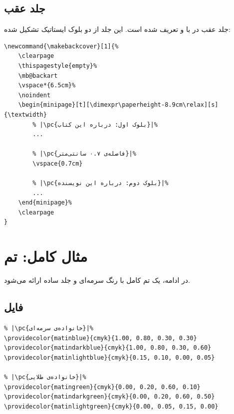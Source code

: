 
\subsection{جلد عقب}
\label{sec:custom-theme-back}

جلد عقب در  با
 و  تعریف
شده است. این جلد از دو بلوک ایستاتیک تشکیل
شده:

\begin{latin}
\begin{verbatim}
\newcommand{\makebackcover}[1]{%
    \clearpage
    \thispagestyle{empty}%
    \mb@backart
    \vspace*{6.5cm}%
    \noindent
    \begin{minipage}[t][\dimexpr\paperheight-8.9cm\relax][s]{\textwidth}
        % |\pc{بلوک اول: درباره این کتاب}|%
        ...

        % |\pc{فاصله‌ی ۰.۷ سانتی‌متر}|%
        \vspace{0.7cm}

        % |\pc{بلوک دوم: درباره این نویسنده}|%
        ...
    \end{minipage}%
    \clearpage
}
\end{verbatim}
\end{latin}


\section{مثال کامل: تم }
\label{sec:custom-theme-example}

در ادامه، یک تم کامل با رنگ سرمه‌ای و
جلد ساده ارائه می‌شود.

\subsection{فایل }
\label{sec:custom-theme-example-colors}

\begin{latin}
\begin{verbatim}
% |\pc{خانواده‌ی سرمه‌ای}|%
\providecolor{matinblue}{cmyk}{1.00, 0.80, 0.30, 0.30}
\providecolor{matindarkblue}{cmyk}{1.00, 0.80, 0.30, 0.60}
\providecolor{matinlightblue}{cmyk}{0.15, 0.10, 0.00, 0.05}

% |\pc{خانواده‌ی طلایی}|%
\providecolor{matingreen}{cmyk}{0.00, 0.20, 0.60, 0.10}
\providecolor{matindarkgreen}{cmyk}{0.00, 0.20, 0.60, 0.50}
\providecolor{matinlightgreen}{cmyk}{0.00, 0.05, 0.15, 0.00}
\end{verbatim}
\end{latin}

